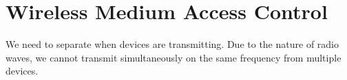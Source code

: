 \section{Wireless Medium Access Control}\label{sec:Wireless_MAC}
We need to separate when devices are transmitting.
Due to the nature of radio waves, we cannot transmit simultaneously on the same frequency from multiple devices.




